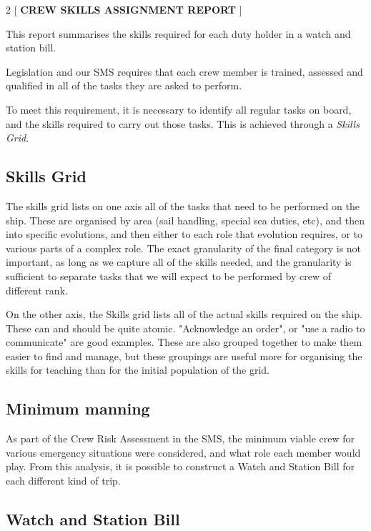 \documentclass[10pt,a4paper,oneside,landscape]{extarticle}
\begin{document}
\raggedbottom

\begin{multicols}{2}
[
{\hfill \Large \bfseries \color{secondcolor} \MakeUppercase{Crew skills assignment report}\hfill}
]
\raggedcolumns

This report summarises the skills required for each duty holder in a watch and station bill. 

Legislation and our SMS requires that each crew member is trained, assessed and qualified in all of the tasks they are asked to perform. 

To meet this requirement, it is necessary to identify all regular tasks on board, and the skills required to carry out those tasks. This is achieved through a \emph{Skills Grid}.

\subsection*{Skills Grid}

The skills grid lists on one axis all of the tasks that need to be performed on the ship. These are organised by area (sail handling, special sea duties, etc), and then into specific evolutions, and then either to each role that evolution requires, or to various parts of a complex role. The exact granularity of the final category is not important, as long as we capture all of the skills needed, and the granularity is sufficient to separate tasks that we will expect to be performed by crew of different rank.

On the other axis, the Skills grid lists all of the actual skills required on the ship. These can and should be quite atomic. "Acknowledge an order", or "use a radio to communicate" are good examples. These are also grouped together to make them easier to find and manage, but these groupings are useful more for organising the skills for teaching than for the initial population of the grid.

\subsection*{Minimum manning}

As part of the Crew Risk Assessment in the SMS, the minimum viable crew for various emergency situations were considered, and what role each member would play. From this analysis, it is possible to construct a Watch and Station Bill for each different kind of trip. 

\subsection*{Watch and Station Bill}


\end{multicols}
\end{document}
